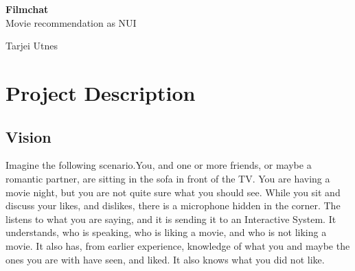 \documentclass[11pt,fleqn]{book} %
\begin{document}

\begingroup
\thispagestyle{empty}
\centering
\vspace*{5cm}
\par\normalfont\fontsize{32}{32}\sffamily\selectfont
\textbf{Filmchat}\\
{\LARGE Movie recommendation as NUI}\par %
\vspace*{1cm}
{\Huge Tarjei Utnes}\par %
\endgroup



\pagestyle{empty} %

\tableofcontents %


\pagestyle{fancy} %



\chapter{Project Description}
\section{Vision}
Imagine the following scenario.You, and one or more friends, or maybe a romantic partner, are sitting in the sofa in front of the TV. You are having a movie night, but you are not quite sure what you should see. While you sit and discuss your likes, and dislikes, there is a microphone hidden in the corner. The listens to what you are saying, and it is sending it to an Interactive System. It understands, who is speaking, who is liking a movie, and who is not liking a movie. It also has, from earlier experience, knowledge of what you and maybe the ones you are with have seen, and liked. It also knows what you did not like.
\end{document}
